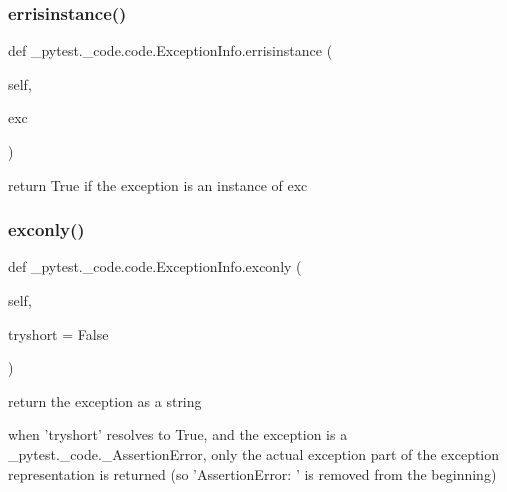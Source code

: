\subsubsection{\texorpdfstring{errisinstance()}{errisinstance()}}
{\footnotesize\ttfamily def \+\_\+pytest.\+\_\+code.\+code.\+Exception\+Info.\+errisinstance (\begin{DoxyParamCaption}\item[{}]{self,  }\item[{}]{exc }\end{DoxyParamCaption})}

\begin{DoxyVerb}return True if the exception is an instance of exc \end{DoxyVerb}
 \mbox{\label{class__pytest_1_1__code_1_1code_1_1_exception_info_a9d620ab4a39df99eb21c640a6e6677ff}} 
\subsubsection{\texorpdfstring{exconly()}{exconly()}}
{\footnotesize\ttfamily def \+\_\+pytest.\+\_\+code.\+code.\+Exception\+Info.\+exconly (\begin{DoxyParamCaption}\item[{}]{self,  }\item[{}]{tryshort = {\ttfamily False} }\end{DoxyParamCaption})}

\begin{DoxyVerb}return the exception as a string

    when 'tryshort' resolves to True, and the exception is a
    _pytest._code._AssertionError, only the actual exception part of
    the exception representation is returned (so 'AssertionError: ' is
    removed from the beginning)
\end{DoxyVerb}
 \mbox{\label{class__pytest_1_1__code_1_1code_1_1_exception_info_adb77d6564f59da03dc2a08ba64484cad}} 
